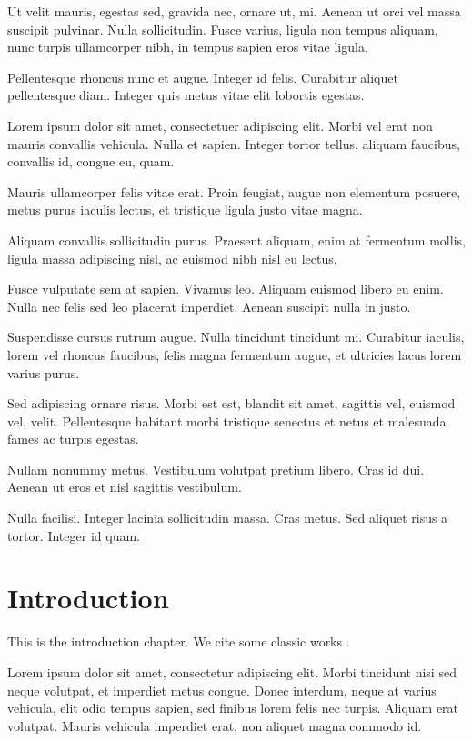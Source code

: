 \documentclass[12pt,reqno,oneside]{amsbook}
\theoremstyle{definition}
\begin{document}
Ut velit mauris, egestas sed, gravida nec, ornare ut, mi. Aenean ut orci vel massa suscipit pulvinar. Nulla sollicitudin. Fusce varius, ligula non tempus aliquam, nunc turpis ullamcorper nibh, in tempus sapien eros vitae ligula.

Pellentesque rhoncus nunc et augue. Integer id felis. Curabitur aliquet pellentesque diam. Integer quis metus vitae elit lobortis egestas.

Lorem ipsum dolor sit amet, consectetuer adipiscing elit. Morbi vel erat non mauris convallis vehicula. Nulla et sapien. Integer tortor tellus, aliquam faucibus, convallis id, congue eu, quam.

Mauris ullamcorper felis vitae erat. Proin feugiat, augue non elementum posuere, metus purus iaculis lectus, et tristique ligula justo vitae magna.

Aliquam convallis sollicitudin purus. Praesent aliquam, enim at fermentum mollis, ligula massa adipiscing nisl, ac euismod nibh nisl eu lectus.

Fusce vulputate sem at sapien. Vivamus leo. Aliquam euismod libero eu enim. Nulla nec felis sed leo placerat imperdiet. Aenean suscipit nulla in justo.

Suspendisse cursus rutrum augue. Nulla tincidunt tincidunt mi. Curabitur iaculis, lorem vel rhoncus faucibus, felis magna fermentum augue, et ultricies lacus lorem varius purus.

Sed adipiscing ornare risus. Morbi est est, blandit sit amet, sagittis vel, euismod vel, velit. Pellentesque habitant morbi tristique senectus et netus et malesuada fames ac turpis egestas.

Nullam nonummy metus. Vestibulum volutpat pretium libero. Cras id dui. Aenean ut eros et nisl sagittis vestibulum.

Nulla facilisi. Integer lacinia sollicitudin massa. Cras metus. Sed aliquet risus a tortor. Integer id quam.



\mainmatter

\doublespacing %

\chapter{Introduction}
This is the introduction chapter. We cite some classic works \cite{Hartshorne,Mumford}.  

Lorem ipsum dolor sit amet, consectetur adipiscing elit. Morbi tincidunt nisi sed neque volutpat, et imperdiet metus congue. Donec interdum, neque at varius vehicula, elit odio tempus sapien, sed finibus lorem felis nec turpis. Aliquam erat volutpat. Mauris vehicula imperdiet erat, non aliquet magna commodo id.
\end{document}
